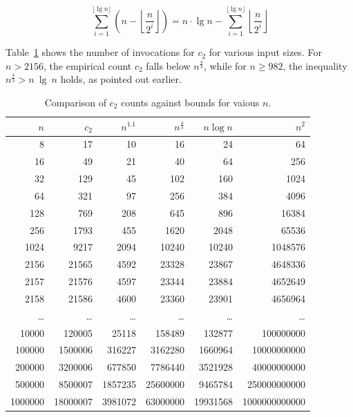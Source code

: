 \[
    \sum_{i=1}^{\lfloor \lg n \rfloor} \left( n - \left\lfloor \frac{n}{2^i} \right\rfloor \right)
    = n \cdot \lg n - \sum_{i=1}^{\lfloor \lg n \rfloor} \left\lfloor \frac{n}{2^i} \right\rfloor
\]

\noindent
Table~\ref{tab:counts} shows the number of invocations for $c_2$ for various input sizes.
For $n > 2156$, the empirical count $c_2$ falls below $n^\frac{4}{3}$, while for $n \geq 982$, the inequality $n^\frac{4}{3} > n\ \lg\ n$ holds, as pointed out earlier.


\begin{table}[h!]
    \centering
    \begin{tabular}{r|r|r|r|r|r}

        \textbf{$n$} & \textbf{$c_2$} & \textbf{$n^{1.1}$} & \textbf{$n^{\frac{4}{3}}$} & \textbf{$n \log n$} & \textbf{$n^2$} \\
        \hline
        8     & 17     & 10     & 16     & 24     & 64      \\
        16    & 49     & 21     & 40     & 64     & 256     \\
        32    & 129    & 45     & 102    & 160    & 1024    \\
        64    & 321    & 97     & 256    & 384    & 4096    \\
        128   & 769    & 208    & 645    & 896    & 16384   \\
        256   & 1793   & 455    & 1620   & 2048   & 65536   \\
        1024  & 9217   & 2094   & 10240  & 10240  & 1048576 \\
        2156  & 21565  & 4592   & 23328  & 23867  & 4648336 \\
        2157  & 21576  & 4597   & 23344  & 23884  & 4652649 \\
        2158  & 21586  & 4600   & 23360  & 23901  & 4656964 \\
        \ldots & \ldots & \ldots & \ldots & \ldots & \ldots \\
        10000 & 120005 & 25118  & 158489 & 132877 & 100000000 \\
        100000 & 1500006 & 316227 & 3162280 & 1660964 & 10000000000 \\
        200000 & 3200006 & 677850 & 7786440 & 3521928 & 40000000000 \\
        500000 & 8500007 & 1857235 & 25600000 & 9465784 & 250000000000 \\
        1000000 & 18000007 & 3981072 & 63000000 & 19931568 & 1000000000000 \\
        \hline
    \end{tabular}
    \smallskip
    \caption{Comparison of $c_2$ counts against bounds for vaious $n$.}
    \label{tab:counts}
\end{table}

